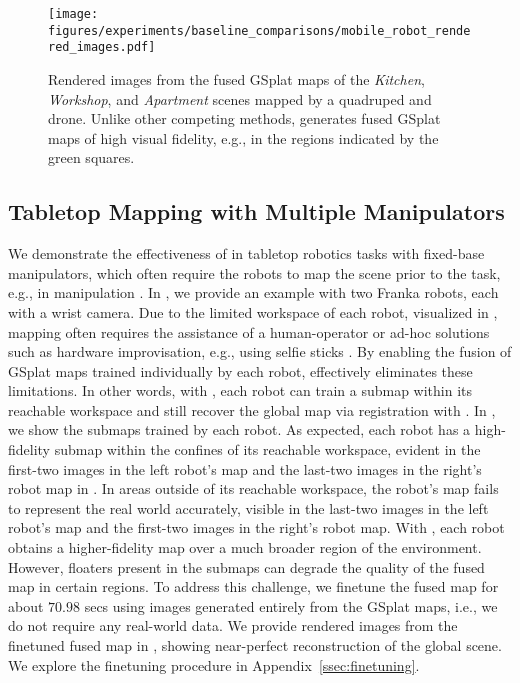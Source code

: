 \begin{figure*}[th]
    \centering
    \texttt{[image: figures/experiments/baseline\_comparisons/mobile\_robot\_rendered\_images.pdf]}
    \caption{Rendered images from the fused GSplat maps of the \emph{Kitchen}, \emph{Workshop}, and \emph{Apartment} scenes mapped by a quadruped and drone. Unlike other competing methods, \algname generates fused GSplat maps of high visual fidelity, e.g., in the regions indicated by the green squares.}
    \label{fig:photometric_performance_mobile_robot_rendered_images}
\end{figure*}


\subsection{Tabletop Mapping with Multiple Manipulators}
We demonstrate the effectiveness of \algname in tabletop robotics tasks with fixed-base manipulators, which often require the robots to map the scene prior to the task, e.g., in manipulation \cite{shen2023distilled, shorinwa2024splat}. In , we provide an example with two Franka robots, each with a wrist camera. Due to the limited workspace of each robot, visualized in , mapping often requires the assistance of a human-operator \cite{shorinwa2024splat} or ad-hoc solutions such as hardware improvisation, e.g., using selfie sticks \cite{shen2023distilled}. By enabling the fusion of GSplat maps trained individually by each robot, \algname effectively eliminates these limitations. In other words, with \algname, each robot can train a submap within its reachable workspace and still recover the global map via registration with \algname. In , we show the submaps trained by each robot. As expected, each robot has a high-fidelity submap within the confines of its reachable workspace, evident in the first-two images in the left robot's map and the last-two images in the right's robot map in . In areas outside of its reachable workspace, the robot's map fails to represent the real world accurately, visible in the last-two images in the left robot's map and the first-two images in the right's robot map. With \algname, each robot obtains a higher-fidelity map over a much broader region of the environment. However, floaters present in the submaps can degrade the quality of the fused map in certain regions. To address this challenge, we finetune the fused map for about $70.98$ secs using images generated entirely from the GSplat maps, i.e., we do not require any real-world data. We provide rendered images from the finetuned fused map in , showing near-perfect reconstruction of the global scene. We explore the finetuning procedure in Appendix~\ref{ssec:finetuning}.

